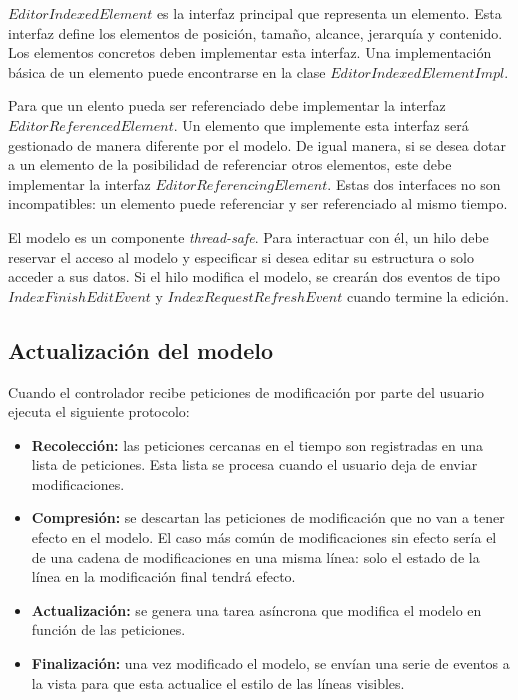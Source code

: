 $EditorIndexedElement$ es la interfaz principal
que representa un elemento.
Esta interfaz define los elementos de posición, tamaño, alcance,
jerarquía y contenido.
Los elementos concretos deben implementar esta interfaz.
Una implementación básica de un elemento puede encontrarse
en la clase $EditorIndexedElementImpl$.

Para que un elento pueda ser referenciado debe
implementar la interfaz $EditorReferencedElement$.
Un elemento que implemente esta interfaz será gestionado
de manera diferente por el modelo.
De igual manera, si se desea dotar a un elemento de la
posibilidad de referenciar otros elementos,
este debe implementar la interfaz $EditorReferencingElement$.
Estas dos interfaces no son incompatibles:
un elemento puede referenciar y ser referenciado
al mismo tiempo.

El modelo es un componente \textit{thread-safe}.
Para interactuar con él, un hilo debe reservar el acceso
al modelo y especificar si desea editar su estructura o
solo acceder a sus datos.
Si el hilo modifica el modelo, se crearán dos eventos de tipo
$IndexFinishEditEvent$ y $IndexRequestRefreshEvent$
cuando termine la edición.

\subsection{Actualización del modelo}\label{subsec:actualizacion-del-modelo}

Cuando el controlador recibe peticiones de modificación
por parte del usuario ejecuta el siguiente protocolo:
\begin{itemize}
    \item \textbf{Recolección:} las peticiones cercanas
    en el tiempo son registradas en una lista de peticiones.
    Esta lista se procesa cuando el usuario deja
    de enviar modificaciones.
    \item \textbf{Compresión:} se descartan las peticiones
    de modificación que no van a tener efecto en el modelo.
    El caso más común de modificaciones sin efecto sería
    el de una cadena de modificaciones en una misma línea:
    solo el estado de la línea en la modificación final
    tendrá efecto.
    \item \textbf{Actualización:} se genera una tarea
    asíncrona que modifica el modelo en función de las
    peticiones.
    \item \textbf{Finalización:} una vez modificado el modelo,
    se envían una serie de eventos
    a la vista para que esta actualice el estilo
    de las líneas visibles.
\end{itemize}

